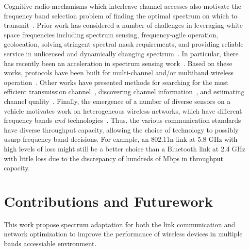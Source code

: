 Cognitive radio mechanisms which interleave channel accesses also motivate the frequency
band selection problem of finding the optimal spectrum on which to 
transmit~\cite{ghasemi2008spectrum}.
Prior work has considered a number of challenges in
leveraging white space frequencies including spectrum sensing, frequency-agile operation,
geolocation, solving stringent spectral mask requirements, and providing reliable service
in unlicensed and dynamically changing spectrum~\cite{shellhammer2009technical}. In particular, there has recently been an acceleration
in spectrum sensing work~\cite{rayanchu2011fluid, kim1996pulse,cabric2004implementation}. Based on 
these works, protocols have been built for multi-channel and/or multiband wireless operation~\cite{MOAR,
raychaudhuri2003spectrum,sabharwal2007opportunistic}.  Other works have presented methods for searching for the most efficient 
transmission channel~\cite{mo2005comparison}, discovering channel information~\cite{rayanchu2011fluid, sabharwal2007opportunistic}, and estimating 
channel quality~\cite{MOAR}.
Finally, the emergence of a number of diverse sensors on a vehicle motivates work
on heterogeneous wireless networks, which have different frequency bands {\it and}
technologies~\cite{hossain2010vehicular}. Thus, the various communication 
standards have diverse throughput capacity, allowing the choice of technology 
to possibly usurp frequency band decisions. For example, an 802.11n link at 5.8 
GHz with high levels of loss
might still be a better choice than a Bluetooth link at 2.4 GHz with little loss
due to the discrepancy of hundreds of Mbps in throughput capacity.









\section{Contributions and Futurework}

This work propose spectrum adaptation for both the link communication and network 
optimization to improve the performance of wireless devices in multiple bands 
accessiable environment.




